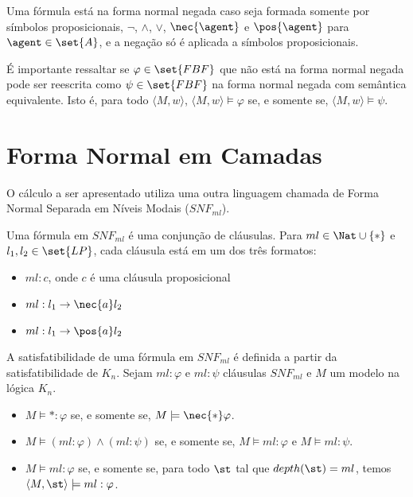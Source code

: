\begin{definition}
	Uma fórmula está na forma normal negada caso seja formada somente por símbolos proposicionais, $\neg$, $\land$, $\lor$, $\nec{\agent}$ e $\pos{\agent}$ para $\agent \in \set{A}$, e a negação só é aplicada a símbolos proposicionais.
\end{definition}

É importante ressaltar se $\varphi \in \set{FBF}$ que não está na forma normal negada pode ser reescrita como $\psi \in \set{FBF}$ na forma normal negada com semântica equivalente. Isto é, para todo $\langle M, w \rangle$, $\langle M, w \rangle \models \varphi$ se, e somente se, $\langle M, w \rangle \models \psi$.

\section{Forma Normal em Camadas}
O cálculo a ser apresentado utiliza uma outra linguagem chamada de Forma Normal Separada em Níveis Modais ($SNF_{ml}$).

\begin{definition}
	Uma fórmula em $SNF_{ml}$ é uma conjunção de cláusulas. Para $ml \in \Nat \cup \{*\}$ e $l_1, l_2 \in \set{LP}$, cada cláusula está em um dos três formatos:
	\begin{itemize}
		\item $ml: c$, onde $c$ é uma cláusula proposicional
		\item $ml: l_1 \rightarrow \nec{a}l_2$
		\item $ml: l_1 \rightarrow \pos{a}l_2$
	\end{itemize}
\end{definition}

A satisfatibilidade de uma fórmula em $SNF_{ml}$ é definida a partir da satisfatibilidade de $K_n$. Sejam $ml: \varphi$ e $ml: \psi$ cláusulas $SNF_{ml}$ e $M$ um modelo na lógica $K_n$.

\begin{itemize}
	\item $M \models *: \varphi$ se, e somente se, $M \models \nec{*}\varphi$.
	\item $M \models (ml: \varphi) \land (ml: \psi)$ se, e somente se, $M \models ml: \varphi$ e $M \models ml: \psi$.
	\item $M \models ml: \varphi$ se, e somente se, para todo $\st$ tal que $depth(\st) = ml$, temos $\langle M, \st \rangle \models ml: \varphi$.
\end{itemize}

